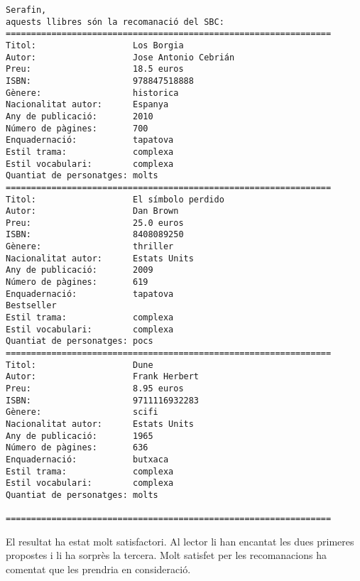 \begin{verbatim}
Serafin, 
aquests llibres són la recomanació del SBC: 
================================================================
Titol:                   Los Borgia
Autor:                   Jose Antonio Cebrián
Preu:                    18.5 euros
ISBN:                    978847518888
Gènere:                  historica
Nacionalitat autor:      Espanya
Any de publicació:       2010
Número de pàgines:       700
Enquadernació:           tapatova
Estil trama:             complexa
Estil vocabulari:        complexa
Quantiat de personatges: molts
================================================================
Titol:                   El símbolo perdido
Autor:                   Dan Brown
Preu:                    25.0 euros
ISBN:                    8408089250
Gènere:                  thriller
Nacionalitat autor:      Estats Units
Any de publicació:       2009
Número de pàgines:       619
Enquadernació:           tapatova
Bestseller
Estil trama:             complexa
Estil vocabulari:        complexa
Quantiat de personatges: pocs
================================================================
Titol:                   Dune
Autor:                   Frank Herbert
Preu:                    8.95 euros
ISBN:                    9711116932283
Gènere:                  scifi
Nacionalitat autor:      Estats Units
Any de publicació:       1965
Número de pàgines:       636
Enquadernació:           butxaca
Estil trama:             complexa
Estil vocabulari:        complexa
Quantiat de personatges: molts

================================================================
\end{verbatim}

El resultat ha estat molt satisfactori. Al lector li han encantat les dues primeres propostes i li ha sorprès la tercera. Molt satisfet per les recomanacions ha comentat que les prendria en consideració.
